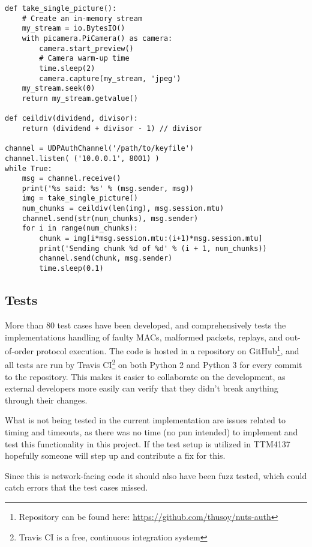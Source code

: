 \begin{lstlisting}[caption=Server Fragmenting Image Data, label=lst:nap-server-image]
def take_single_picture():
    # Create an in-memory stream
    my_stream = io.BytesIO()
    with picamera.PiCamera() as camera:
        camera.start_preview()
        # Camera warm-up time
        time.sleep(2)
        camera.capture(my_stream, 'jpeg')
    my_stream.seek(0)
    return my_stream.getvalue()

def ceildiv(dividend, divisor):
    return (dividend + divisor - 1) // divisor

channel = UDPAuthChannel('/path/to/keyfile')
channel.listen( ('10.0.0.1', 8001) )
while True:
    msg = channel.receive()
    print('%s said: %s' % (msg.sender, msg))
    img = take_single_picture()
    num_chunks = ceildiv(len(img), msg.session.mtu)
    channel.send(str(num_chunks), msg.sender)
    for i in range(num_chunks):
        chunk = img[i*msg.session.mtu:(i+1)*msg.session.mtu]
        print('Sending chunk %d of %d' % (i + 1, num_chunks))
        channel.send(chunk, msg.sender)
        time.sleep(0.1)
\end{lstlisting}

    \subsection{Tests}

More than 80 test cases have been developed, and comprehensively tests the implementations handling of faulty MACs, malformed packets, replays, and out-of-order protocol execution. The code is hosted in a repository on GitHub\footnote{Repository can be found here: \url{https://github.com/thusoy/nuts-auth}}, and all tests are run by Travis CI\footnote{Travis CI is a free, continuous integration system} on both Python 2 and Python 3 for every commit to the repository. This makes it easier to collaborate on the development, as external developers more easily can verify that they didn't break anything through their changes.

What is not being tested in the current implementation are issues related to timing and timeouts, as there was no time (no pun intended) to implement and test this functionality in this project. If the test setup is utilized in TTM4137 hopefully someone will step up and contribute a fix for this.

Since this is network-facing code it should also have been fuzz tested, which could catch errors that the test cases missed.


